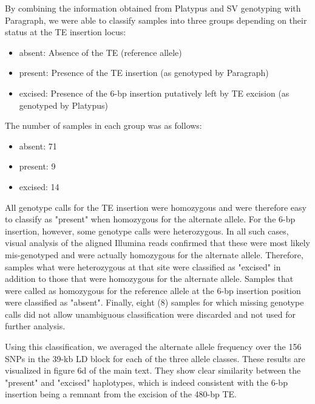 \documentclass[12pt]{article}
\begin{document}
By combining the information obtained from Platypus and SV genotyping with Paragraph, we were able to classify samples into three groups depending on their status at the TE insertion locus:

\begin{itemize}
	\item absent: Absence of the TE (reference allele)
	\item present: Presence of the TE insertion (as genotyped by Paragraph)
	\item excised: Presence of the 6-bp insertion putatively left by TE excision (as genotyped by Platypus)
\end{itemize}

The number of samples in each group was as follows:

\begin{itemize}
	\item absent: 71 
	\item present: 9
	\item excised: 14
\end{itemize}

All genotype calls for the TE insertion were homozygous and were therefore easy to classify as "present" when homozygous for the alternate allele.
For the 6-bp insertion, however, some genotype calls were heterozygous. 
In all such cases, visual analysis of the aligned Illumina reads confirmed that these were most likely mis-genotyped and were actually homozygous for the alternate allele.
Therefore, samples what were heterozygous at that site were classified as "excised" in addition to those that were homozygous for the alternate allele.
Samples that were called as homozygous for the reference allele at the 6-bp insertion position were classified as "absent".
Finally, eight (8) samples for which missing genotype calls did not allow unambiguous classification were discarded and not used for further analysis.

Using this classification, we averaged the alternate allele frequency over the 156 SNPs in the 39-kb LD block for each of the three allele classes.
These results are visualized in figure 6d of the main text.
They show clear similarity between the "present" and "excised" haplotypes, which is indeed consistent with the 6-bp insertion being a remnant from the excision of the 480-bp TE.

\clearpage
\end{document}
